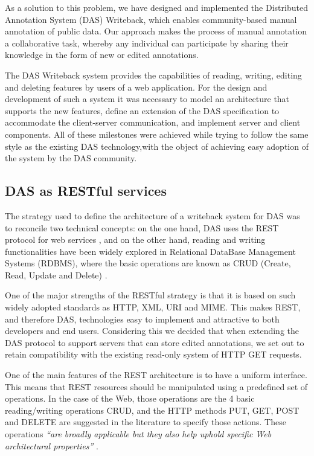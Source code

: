As a solution to this problem, we have designed and implemented the Distributed Annotation System (DAS) Writeback, which enables community-based manual annotation of public data. Our approach makes the process of manual annotation a collaborative task, whereby any individual can participate by sharing their knowledge in the form of new or edited annotations.

The DAS Writeback system provides the capabilities of reading, writing, editing and deleting features by users of a web application. For the design and development of such a system it was necessary to model an architecture that supports the new features, define an extension of the DAS specification to accommodate the client-server communication, and implement server and client components. All of these milestones were achieved while trying to follow the same style as the existing DAS technology,with the object of achieving easy adoption of the system by the DAS community.

\subsection{DAS as RESTful services}
The strategy used to define the architecture of a writeback system for DAS was to reconcile two technical concepts: on the one hand, DAS uses the REST protocol for web services \cite{PRL2007}, and on the other hand, reading and writing functionalities have been widely explored in Relational DataBase Management Systems (RDBMS), where the basic operations are  known as CRUD (Create, Read, Update and Delete) \cite{KIL1990}.

One of the major strengths of the RESTful strategy is that it is based on such widely adopted standards as HTTP, XML, URI and MIME. This makes REST, and therefore DAS, technologies easy to implement and attractive to both developers and end users. Considering this we decided that when extending the DAS protocol to support servers that can store edited annotations, we set out to retain compatibility with the existing read-only system of HTTP GET requests. 

One of the main features of the REST architecture is to have a uniform interface. This means that REST resources should be manipulated using a predefined set of operations. In the case of the Web, those operations are the 4 basic reading/writing operations CRUD, and the HTTP methods PUT, GET, POST and DELETE are suggested in the literature to specify those actions. These operations \textit{``are broadly applicable but they also help uphold specific Web architectural properties''} \cite{VIN2008}.

